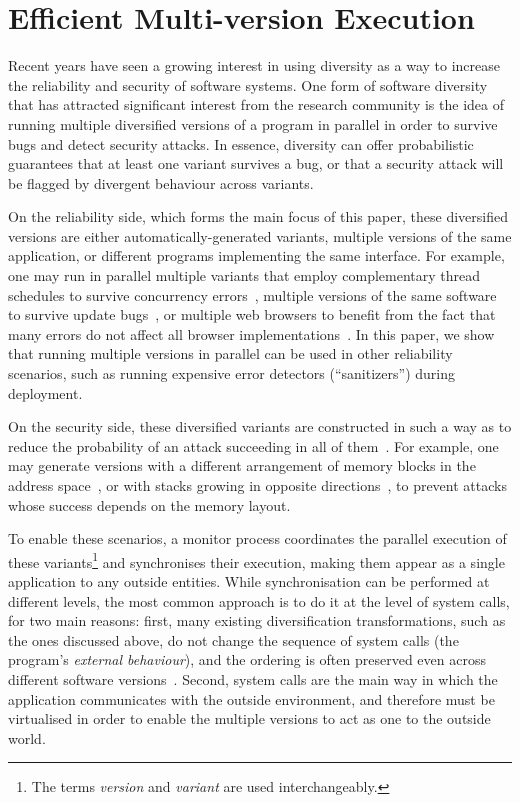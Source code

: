 \chapter{Efficient Multi-version Execution}

Recent years have seen a growing interest in using diversity as a way
to increase the reliability and security of software systems.  One
form of software diversity that has attracted significant interest
from the research community is the idea of running multiple
diversified versions of a program in parallel in order to survive bugs
and detect security attacks.  In essence, diversity can offer
probabilistic guarantees that at least one variant survives a bug, or
that a security attack will be flagged by divergent behaviour across
variants.

On the reliability side, which forms the main focus of this paper,
these diversified versions are either automatically-generated
variants, multiple versions of the same application, or different
programs implementing the same interface.  For example, one may run in
parallel multiple variants that employ complementary thread schedules
to survive concurrency errors~\cite{compl-schedules11}, multiple
versions of the same software to survive update bugs~\cite{mx}, or
multiple web browsers to benefit from the fact that many errors do not
affect all browser implementations~\cite{cocktail}.  In this paper, we
show that running multiple versions in parallel can be used in other
reliability scenarios, such as running expensive error detectors
(``sanitizers'') during deployment.

On the security side, these diversified variants are constructed in
such a way as to reduce the probability of an attack succeeding in all
of
them~\cite{cox2006,orchestra09,diehard06,tightlip,capizzi08,devries10,cocktail,trachsel10}.
For example, one may generate versions with a different arrangement of
memory blocks in the address space~\cite{diehard06}, or with stacks
growing in opposite directions~\cite{orchestra09}, to prevent attacks
whose success depends on the memory layout.

To enable these scenarios, a monitor process coordinates the parallel
execution of these variants\footnote{The terms \textit{version} and
  \textit{variant} are used interchangeably.} and synchronises their
execution, making them appear as a single application to any outside
entities.  While synchronisation can be performed at different levels,
the most common approach is to do it at the level of system calls, for
two main reasons: first, many existing diversification
transformations, such as the ones discussed above, 
do not change the sequence of system calls (the program's
\textit{external behaviour}), and the ordering is often preserved even
across different software versions~\cite{mx}.  Second, system calls
are the main way in which the application communicates with the
outside environment, and therefore
must be virtualised in order to enable the multiple versions to act as
one to the outside world.

